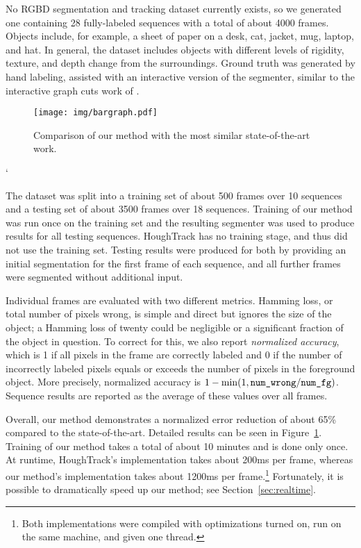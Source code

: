 \documentclass[graybox]{svmult}
\renewcommand{\todo}[1]{\textcolor{red}{}}
\newcommand{\todoCR}[1]{\textcolor{blue}{}}
\begin{document}
No RGBD segmentation and tracking dataset currently exists, so we generated one containing 28 fully-labeled sequences with a total of about 4000 frames. Objects include, for example, a sheet of paper on a desk, cat, jacket, mug, laptop, and hat. In general, the dataset includes objects with different levels of rigidity, texture, and depth change from the surroundings. \todo{what is the right word for this?  \ie a poster flush to the wall vs a mug sticking up out of the desk} Ground truth was generated by hand labeling, assisted with an interactive version of the segmenter, similar to the interactive graph cuts work of \cite{boykov2001a}.

\begin{figure}
  \centering
  \texttt{[image: img/bargraph.pdf]}
  \caption{Comparison of our method with the most similar state-of-the-art work.}
  \label{fig:bargraph}
  \vspace{50pt}
\end{figure}
`

The dataset was split into a training set of about 500 frames over 10 sequences and a testing set of about 3500 frames over 18 sequences.  Training of our method was run once on the training set and the resulting segmenter was used to produce results for all testing sequences. HoughTrack has no training stage, and thus did not use the training set.  Testing results were produced for both by providing an initial segmentation for the first frame of each sequence, and all further frames were segmented without additional input.

Individual frames are evaluated with two different metrics.  Hamming loss, or total number of pixels wrong, is simple and direct but ignores the size of the object; a Hamming loss of twenty could be negligible or a significant fraction of the object in question.  To correct for this, we also report \emph{normalized accuracy}, which is 1 if all pixels in the frame are correctly labeled and 0 if the number of incorrectly labeled pixels equals or exceeds the number of pixels in the foreground object.  More precisely, normalized accuracy is $1 - \min(1, \mbox{\texttt{num\_wrong}} / \mbox{\texttt{num\_fg}})$.  Sequence results are reported as the average of these values over all frames.

Overall, our method demonstrates a normalized error reduction of about 65\% compared to the state-of-the-art.  Detailed results can be seen in Figure~\ref{fig:bargraph}.  Training of our method takes a total of about 10 minutes and is done only once.  At runtime, HoughTrack's implementation takes about 200ms per frame, whereas our method's implementation takes about 1200ms per frame.\footnote{Both implementations were compiled with optimizations turned on, run on the same machine, and given one thread.}  Fortunately, it is possible to dramatically speed up our method; see Section~\ref{sec:realtime}.  \todoCR{These timing results were from Rg.  It'd be better for everything to be from Aluminum.}
\end{document}
